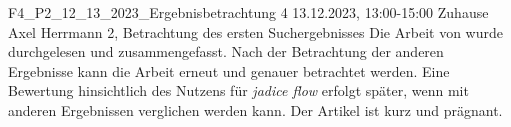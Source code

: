 \fieldnote
{F4\_P2\_12\_13\_2023\_Ergebnisbetrachtung}
{4}
{13.12.2023, 13:00-15:00}
{Zuhause}
{Axel Herrmann}
{2, Betrachtung des ersten Suchergebnisses}
{
	Die Arbeit von  wurde durchgelesen und zusammengefasst.
}
{
	Nach der Betrachtung der anderen Ergebnisse kann die Arbeit erneut und genauer betrachtet werden.
	Eine Bewertung hinsichtlich des Nutzens für \emph{jadice flow} erfolgt später, wenn mit anderen Ergebnissen verglichen werden kann. 
}
{
	Der Artikel ist kurz und prägnant.
}
{}
{
	
}

